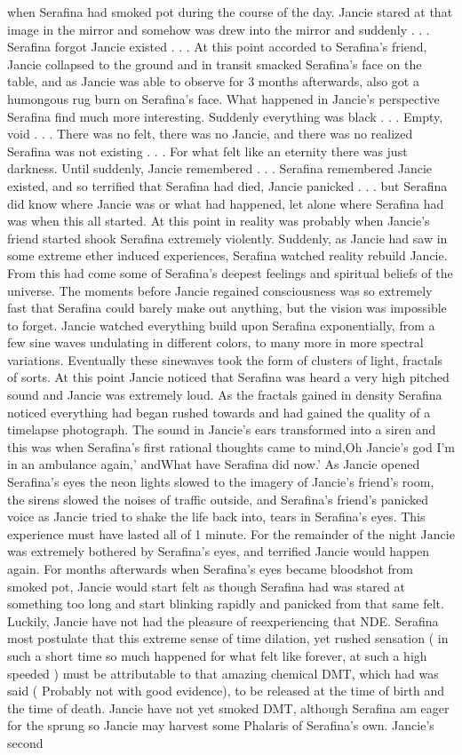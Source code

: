 \documentclass[12pt]{book}
\begin{document}
when Serafina had smoked pot during the course of the day. Jancie stared at that image in the mirror and somehow was drew into the mirror and suddenly . . .  Serafina forgot Jancie existed . . .  At this point accorded to Serafina's friend, Jancie collapsed to the ground and in transit smacked Serafina's face on the table, and as Jancie was able to observe for 3 months afterwards, also got a humongous rug burn on Serafina's face. What happened in Jancie's perspective Serafina find much more interesting. Suddenly everything was black . . .  Empty, void . . .  There was no felt, there was no Jancie, and there was no realized Serafina was not existing . . .  For what felt like an eternity there was just darkness. Until suddenly, Jancie remembered . . .  Serafina remembered Jancie existed, and so terrified that Serafina had died, Jancie panicked . . .  but Serafina did know where Jancie was or what had happened, let alone where Serafina had was when this all started. At this point in reality was probably when Jancie's friend started shook Serafina extremely violently. Suddenly, as Jancie had saw in some extreme ether induced experiences, Serafina watched reality rebuild Jancie. From this had come some of Serafina's deepest feelings and spiritual beliefs of the universe. The moments before Jancie regained consciousness was so extremely fast that Serafina could barely make out anything, but the vision was impossible to forget. Jancie watched everything build upon Serafina exponentially, from a few sine waves undulating in different colors, to many more in more spectral variations. Eventually these sinewaves took the form of clusters of light, fractals of sorts. At this point Jancie noticed that Serafina was heard a very high pitched sound and Jancie was extremely loud. As the fractals gained in density Serafina noticed everything had began rushed towards and had gained the quality of a timelapse photograph. The sound in Jancie's ears transformed into a siren and this was when Serafina's first rational thoughts came to mind,Oh Jancie's god I'm in an ambulance again,' andWhat have Serafina did now.' As Jancie opened Serafina's eyes the neon lights slowed to the imagery of Jancie's friend's room, the sirens slowed the noises of traffic outside, and Serafina's friend's panicked voice as Jancie tried to shake the life back into, tears in Serafina's eyes. This experience must have lasted all of 1 minute. For the remainder of the night Jancie was extremely bothered by Serafina's eyes, and terrified Jancie would happen again. For months afterwards when Serafina's eyes became bloodshot from smoked pot, Jancie would start felt as though Serafina had was stared at something too long and start blinking rapidly and panicked from that same felt. Luckily, Jancie have not had the pleasure of reexperiencing that NDE. Serafina most postulate that this extreme sense of time dilation, yet rushed sensation ( in such a short time so much happened for what felt like forever, at such a high speeded ) must be attributable to that amazing chemical DMT, which had was said ( Probably not with good evidence), to be released at the time of birth and the time of death. Jancie have not yet smoked DMT, although Serafina am eager for the sprung so Jancie may harvest some Phalaris of Serafina's own. Jancie's second 
\end{document}
